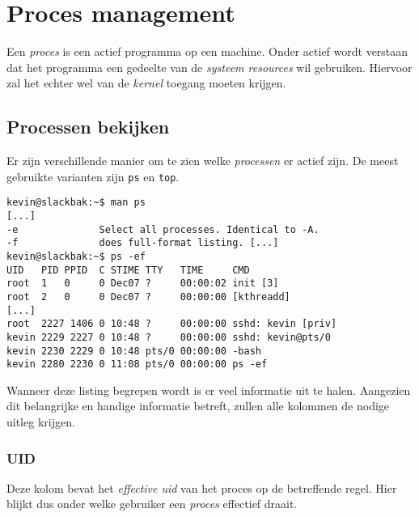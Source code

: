 %
%
%
%

\chapter{Proces management}
Een \emph{proces} is een actief programma op een machine. Onder actief wordt verstaan dat het programma een gedeelte van de \emph{systeem resources} wil gebruiken. Hiervoor zal het echter wel van de \emph{kernel} toegang moeten krijgen. 

\section{Processen bekijken}
Er zijn verschillende manier om te zien welke \emph{processen} er actief zijn. De meest gebruikte varianten zijn \texttt{ps} en \texttt{top}. 
\begin{lstlisting}
kevin@slackbak:~$ man ps
[...]
-e              Select all processes. Identical to -A.
-f              does full-format listing. [...]
kevin@slackbak:~$ ps -ef 
UID   PID PPID  C STIME TTY   TIME     CMD
root  1   0     0 Dec07 ?     00:00:02 init [3]  
root  2   0     0 Dec07 ?     00:00:00 [kthreadd]
[...]
root  2227 1406 0 10:48 ?     00:00:00 sshd: kevin [priv]
kevin 2229 2227 0 10:48 ?     00:00:00 sshd: kevin@pts/0
kevin 2230 2229 0 10:48 pts/0 00:00:00 -bash
kevin 2280 2230 0 11:08 pts/0 00:00:00 ps -ef
\end{lstlisting}
Wanneer deze listing begrepen wordt is er veel informatie uit te halen. Aangezien dit belangrijke en handige informatie betreft, zullen alle kolommen de nodige uitleg krijgen. 

\subsection{UID}
Deze kolom bevat het \emph{effective uid} van het proces op de betreffende regel. Hier blijkt dus onder welke gebruiker een \emph{proces} effectief draait. 

